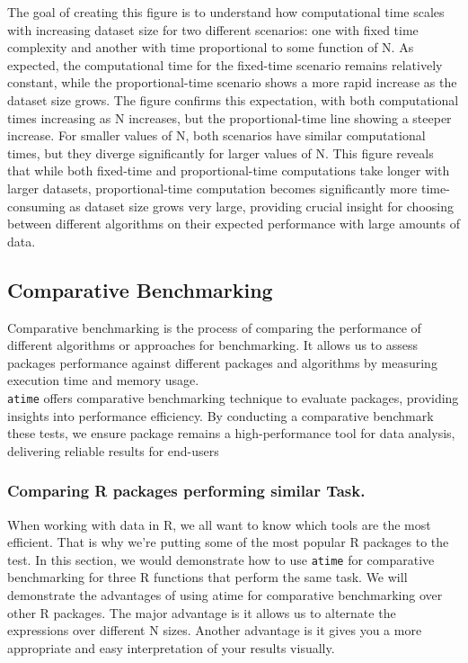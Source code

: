 \noindent The goal of creating this figure is to understand how computational time scales with increasing dataset size for two different scenarios: one with fixed time complexity and another with time proportional to some function of N. As expected, the computational time for the fixed-time scenario remains relatively constant, while the proportional-time scenario shows a more rapid increase as the dataset size grows. The figure confirms this expectation, with both computational times increasing as N increases, but the proportional-time line showing a steeper increase. For smaller values of N, both scenarios have similar computational times, but they diverge significantly for larger values of N. This figure reveals that while both fixed-time and proportional-time computations take longer with larger datasets, proportional-time computation becomes significantly more time-consuming as dataset size grows very large, providing crucial insight for choosing between different algorithms on their expected performance with large amounts of data.\\

\subsection{Comparative Benchmarking}

\noindent Comparative benchmarking is the process of comparing the performance of different algorithms or approaches for benchmarking. It allows us to assess packages performance against different packages and algorithms by measuring execution time and memory usage.\\

\noindent \texttt{atime} offers comparative benchmarking technique to evaluate packages, providing insights into performance efficiency. By conducting a comparative benchmark these tests, we ensure package remains a high-performance tool for data analysis, delivering reliable results for end-users\\

\subsubsection{Comparing R packages performing similar Task.}
\noindent When working with data in R, we all want to know which tools are the most efficient. That is why we're putting some of the most popular R packages to the test. 
In this section, we would demonstrate how to use \texttt{atime} for comparative benchmarking for three R functions that perform the same task. We will demonstrate the advantages of using atime for comparative benchmarking over other R packages. The major advantage is it allows us to alternate the expressions over different N sizes. Another advantage is it gives you a more appropriate and easy interpretation of your results visually.\\

